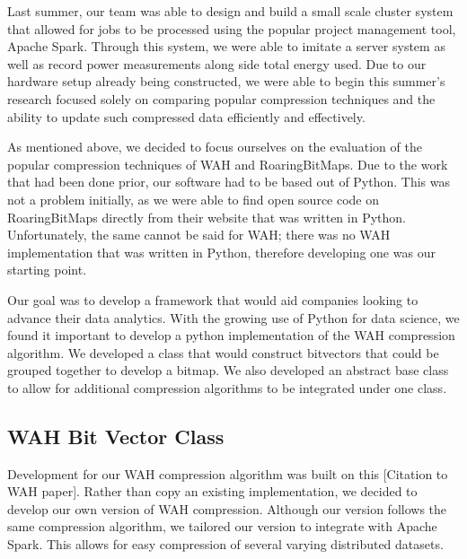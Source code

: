 \documentclass{article}
\begin{document}
Last summer, our team was able to design and build a small scale cluster system that allowed for jobs to be processed using the popular project management tool, Apache Spark. Through this system, we were able to imitate a server system as well as record power measurements along side total energy used. Due to our hardware setup already being constructed, we were able to begin this summer's research focused solely on comparing popular compression techniques and the ability to update such compressed data efficiently and effectively. \par 
As mentioned above, we decided to focus ourselves on the evaluation of the popular compression techniques of WAH and RoaringBitMaps. Due to the work that had been done prior, our software had to be based out of Python. This was not a problem initially, as we were able to find open source code on RoaringBitMaps directly from their website that was written in Python. Unfortunately, the same cannot be said for WAH; there was no WAH implementation that was written in Python, therefore developing one was our starting point. \par
Our goal was to develop a framework that would aid companies looking to advance their data analytics. With the growing use of Python for data science, we found it important to develop a python implementation of the WAH compression algorithm. We developed a class that would construct bitvectors that could be grouped together to develop a bitmap. We also developed an abstract base class to allow for additional compression algorithms to be integrated under one class. 


%
%
\subsection{WAH Bit Vector Class}
\justify
Development for our WAH compression algorithm was built on this [Citation to WAH paper]. Rather than copy an existing implementation, we decided to develop our own version of WAH compression. Although our version follows the same compression algorithm, we tailored our version to integrate with Apache Spark. This allows for easy compression of several varying distributed datasets. 
\end{document}
